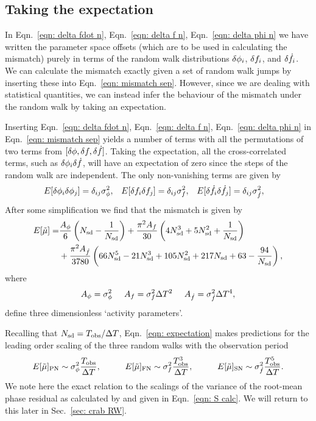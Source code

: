 \documentclass[../full_thesis/full_thesis.tex]{subfiles}
\begin{document}
\subsection{Taking the expectation}

In Eqn.~\eqref{eqn: delta fdot n}, Eqn.~\eqref{eqn: delta f n},
Eqn.~\eqref{eqn: delta phi n} we have written the parameter space offsets
(which are to be used in calculating the mismatch) purely in terms of the
random walk distributions $\delta \phi_i$, $\delta f_i$, and $\delta \dot{f}_i$. We can
calculate the mismatch exactly given a set of random walk jumps by inserting
these into Eqn.~\eqref{eqn: mismatch sep}. However, since we are dealing with
statistical quantities, we can instead infer the behaviour of the mismatch
under the random walk by taking an expectation.

Inserting Eqn.~\eqref{eqn: delta fdot n}, Eqn.~\eqref{eqn: delta f n},
Eqn.~\eqref{eqn: delta phi n}  in Eqn.~\eqref{eqn: mismatch sep} yields a
number of terms with all the permutations of two terms from $[\delta \phi, \delta f,
\delta \dot{f}]$. Taking the expectation, all the cross-correlated terms, such as
$\delta\phi_{i}\delta \dot{f}$, will have an expectation of zero since the steps of the
random walk are independent. The only non-vanishing terms are given by
\begin{align}
E[\delta\phi_{i}\delta\phi_{j}] &= \delta_{ij}\sigma_{\phi}^{2}, &
E[\delta f_{i}\delta f_{j}] &= \delta_{ij}\sigma_{f}^{2},&
E[\delta\dot{f}_{i}\delta\dot{f}_{j}] &= \delta_{ij}\sigma_{\dot{f}}^{2},
\end{align}
After some simplification we find that the mismatch is given by
\begin{align}
\begin{split}
E[\tilde{\mu}]   = &  \frac{A_{\phi}}{6} \left(N_{\textrm{sd}} - \frac{1}{N_{\textrm{sd}}}\right)
+ \frac{\pi^{2} A_{{f}}}{30}\left(4 N_{\textrm{sd}}^{3} + 5 N_{\textrm{sd}}^{2} + \frac{1}{N_{\textrm{sd}}}\right)\\
 & +  \frac{\pi^{2} A_{{\dot{f}}}}{3780} \left(66 N_{\textrm{sd}}^{5} - 21 N_{\textrm{sd}}^{3} + 105 N_{\textrm{sd}}^{2}
 + 217 N_{\textrm{sd}} + 63 - \frac{94}{N_{\textrm{sd}}}\right),
\end{split}
\label{eqn: expectation}
\end{align}
where
\begin{equation}
	A_{\phi} = \sigma_{\phi}^{2} \;\;\;\;\;
    A_{f} = \sigma_{f}^{2}\Delta T^{2} \;\;\;\;\;
    A_{\dot{f}} = \sigma_{\dot{f}}^{2}\Delta T^{4},
\end{equation}
define three dimensionless `activity parameters'.

Recalling that $N_{\textrm{sd}}=T_{\mathrm{obs}}/\Delta T$, Eqn.~\eqref{eqn: expectation} makes
predictions for the leading order
scaling of the three random walks with the observation period
\begin{equation}
E[\mutilde]_{\mathrm{PN}} \sim \sigP \frac{\Tobs}{\Delta T}, \hspace{10mm}
E[\mutilde]_{\mathrm{FN}} \sim \sigF \frac{\Tobs^{3}}{\Delta T}, \hspace{10mm}
E[\mutilde]_{\mathrm{SN}} \sim \sigS \frac{\Tobs^{5}}{\Delta T}.
\label{eqn: scalings}
\end{equation}
We note here the exact relation to the scalings of the variance of the
root-mean phase residual as calculated by \citet{Cordes1980} and given in
Eqn.~\eqref{eqn: S calc}. We will return to this later in Sec.~\ref{sec: crab RW}.
\end{document}
